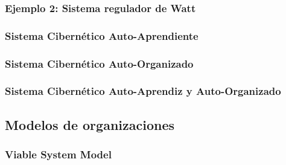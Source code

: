 \subsubsection{Ejemplo 2: Sistema regulador de Watt}
\subsubsection{Sistema Cibernético Auto-Aprendiente}
\subsubsection{Sistema Cibernético Auto-Organizado}
\subsubsection{Sistema Cibernético Auto-Aprendiz y Auto-Organizado}

\subsection{Modelos de organizaciones}
\subsubsection{Viable System Model}
